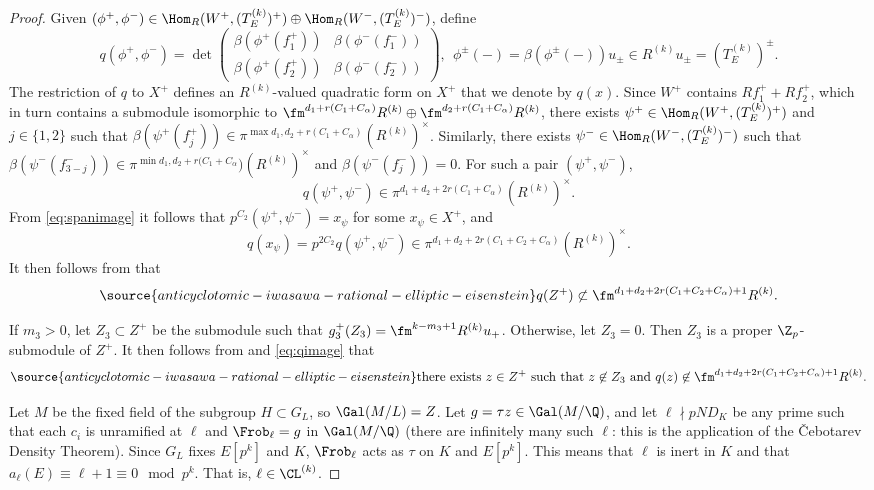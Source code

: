 \begin{proof}
Given $(\phi^+,\phi^-) \in \Hom_R(W^+,(T_E^{(k)})^+)\oplus \Hom_R(W^-,(T_E^{(k)})^-)$, define
$$
q(\phi^+,\phi^-) = \det\left(\begin{matrix}
\beta(\phi^+(f_1^+)) & \beta(\phi^-(f_1^-)) \\
\beta(\phi^+(f_2^+)) & \beta(\phi^-(f_2^-))
\end{matrix}\right), \ \
\phi^\pm(-) = \beta(\phi^\pm(-))u_{\pm}\in R^{(k)}u_\pm = (T_E^{(k)})^\pm.
$$
The restriction of $q$ to $X^+$ defines an $R^{(k)}$-valued quadratic form
on $X^+$ that we denote by $q(x)$.
Since $W^+$ contains $Rf_1^+ +R f_2^+$, which in turn contains
a submodule isomorphic to
$\fm^{d_1+r(C_1+C_\alpha)}R^{(k)}\oplus \fm^{d_2+r(C_1+C_\alpha)}R^{(k)}$, there exists
$\psi^+\in \Hom_R(W^+,(T_E^{(k)})^+)$ and $j\in \{1,2\}$ such that
$\beta(\psi^+(f_j^+)) \in \pi^{\max{d_1,d_2}+r(C_1+C_\alpha)}(R^{(k)})^\times$.
Similarly, there exists $\psi^-\in \Hom_R(W^-,(T_E^{(k)})^-)$
such that $\beta(\psi^-(f_{3-j}^-)) \in \pi^{\min{d_1,d_2}+r(C_1+C_\alpha})(R^{(k)})^\times$
and $\beta(\psi^-(f_j^-)) = 0$.
For such a pair $(\psi^+,\psi^-)$,
$$
q(\psi^+,\psi^-) \in \pi^{d_1+d_2+2r(C_1+C_\alpha)}(R^{(k)})^\times.
$$
From \eqref{eq:spanimage} it follows that $p^{C_2}(\psi^+,\psi^-) = x_\psi$ for some $x_\psi\in X^+$, and
$$
q(x_\psi) = p^{2C_2}q(\psi^+,\psi^-)
\in\pi^{d_1+d_2+2r(C_1+C_2+C_\alpha)}(R^{(k)})^\times.
$$
It then follows from \cite[Lem.~(6.6.1)(ii)]{nekovar} that
\begin{equation}\label{eq:qimage}
\source{anticyclotomic-iwasawa-rational-elliptic-eisenstein}
q(Z^+) \not\subset \fm^{d_1+d_2+2r(C_1+C_2+C_\alpha)+1}R^{(k)}.
\end{equation}

If $m_3>0$, let $Z_3\subset Z^+$ be the submodule such that
$g_3^+(Z_3) = \fm^{k-{m_3}+1}R^{(k)} u_+$. Otherwise, let $Z_3 =0$. Then $Z_3$ is a proper $\Z_p$-submodule of $Z^+$.
It then follows from \cite[Lem.~(6.6.1)(iii)]{nekovar} and \eqref{eq:qimage} that
\begin{equation}\label{eq:z}
\source{anticyclotomic-iwasawa-rational-elliptic-eisenstein}
\text{there exists $z\in Z^+$ such that $z\not\in Z_3$ and $q(z) \not\in \fm^{d_1+d_2+2r(C_1+C_2+C_\alpha)+1}R^{(k)}$.}
\end{equation}

Let $M$ be the fixed field of the subgroup $H\subset G_L$, so $\Gal(M/L) = Z$.
Let $g = \tau z \in \Gal(M/\Q)$, and let
$\ell\nmid pND_K$ be any prime such that each $c_i$ is unramified at $\ell$ and $\Frob_\ell = g$ in $\Gal(M/\Q)$
(there are infinitely many such $\ell$: this is the application of the \v{C}ebotarev Density Theorem).
Since $G_L$ fixes $E[p^k]$ and $K$,
$\Frob_\ell$ acts as $\tau$ on $K$ and $E[p^k]$.
This means that $\ell$ is inert in $K$ and that $a_\ell(E) \equiv \ell +1 \equiv 0 \mod p^k$.
That is, $\ell\in \CL^{(k)}$.


\end{proof}
